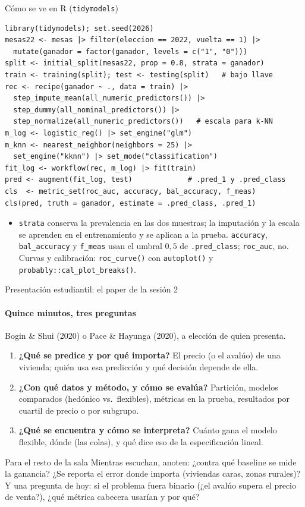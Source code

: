 \documentclass{beamer}
\newcommand{\1}{\mathbb{I}}
\begin{document}
\begin{frame}[fragile]{Cómo se ve en R (\texttt{tidymodels})}
\scriptsize
\begin{verbatim}
library(tidymodels); set.seed(2026)
mesas22 <- mesas |> filter(eleccion == 2022, vuelta == 1) |>
  mutate(ganador = factor(ganador, levels = c("1", "0")))
split <- initial_split(mesas22, prop = 0.8, strata = ganador)
train <- training(split); test <- testing(split)   # bajo llave
rec <- recipe(ganador ~ ., data = train) |>
  step_impute_mean(all_numeric_predictors()) |>
  step_dummy(all_nominal_predictors()) |>
  step_normalize(all_numeric_predictors())   # escala para k-NN
m_log <- logistic_reg() |> set_engine("glm")
m_knn <- nearest_neighbor(neighbors = 25) |>
  set_engine("kknn") |> set_mode("classification")
fit_log <- workflow(rec, m_log) |> fit(train)
pred <- augment(fit_log, test)             # .pred_1 y .pred_class
cls  <- metric_set(roc_auc, accuracy, bal_accuracy, f_meas)
cls(pred, truth = ganador, estimate = .pred_class, .pred_1)
\end{verbatim}
\normalsize
\small
\begin{itemize}\itemsep2pt
  \item \texttt{strata} conserva la prevalencia en las dos muestras; la imputación y la escala se aprenden en el entrenamiento y se aplican a la prueba. \texttt{accuracy}, \texttt{bal\_accuracy} y \texttt{f\_meas} usan el umbral $0{,}5$ de \texttt{.pred\_class}; \texttt{roc\_auc}, no. Curvas y calibración: \texttt{roc\_curve()} con \texttt{autoplot()} y \texttt{probably::cal\_plot\_breaks()}.
\end{itemize}
\end{frame}

\begin{frame}{Presentación estudiantil: el paper de la sesión 2}
\framesubtitle{Quince minutos, tres preguntas}
\small
Bogin \& Shui (2020) o Pace \& Hayunga (2020), a elección de quien presenta.
\begin{enumerate}\itemsep6pt
  \item \textbf{¿Qué se predice y por qué importa?} El precio (o el avalúo) de una vivienda; quién usa esa predicción y qué decisión depende de ella.
  \item \textbf{¿Con qué datos y método, y cómo se evalúa?} Partición, modelos comparados (hedónico vs.\ flexibles), métricas en la prueba, resultados por cuartil de precio o por subgrupo.
  \item \textbf{¿Qué se encuentra y cómo se interpreta?} Cuánto gana el modelo flexible, dónde (las colas), y qué dice eso de la especificación lineal.
\end{enumerate}
\pause
\vspace{0.2cm}
\begin{block}{Para el resto de la sala}
Mientras escuchan, anoten: ¿contra qué baseline se mide la ganancia? ¿Se reporta el error donde importa (viviendas caras, zonas rurales)? Y una pregunta de hoy: si el problema fuera binario (¿el avalúo supera el precio de venta?), ¿qué métrica cabecera usarían y por qué?
\end{block}
\end{frame}
\end{document}
